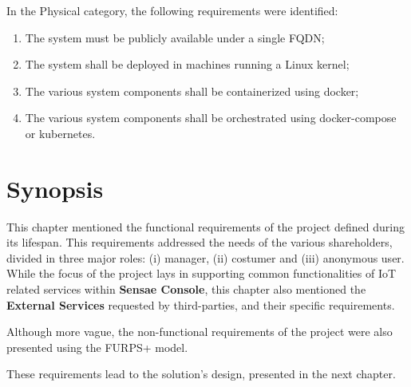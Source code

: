 In the Physical category, the following requirements were identified:

\begin{enumerate}
    \item The system must be publicly available under a single \gls{FQDN};
    \item The system shall be deployed in machines running a Linux kernel;
    \item The various system components shall be containerized using docker;
    \item The various system components shall be orchestrated using docker-compose or kubernetes.
\end{enumerate}

\section{Synopsis}
\label{subsec:requirements:synopsis}

This chapter mentioned the functional requirements of the project defined during its lifespan. This requirements addressed the needs of the various shareholders, divided in three major roles: (i) manager, (ii) costumer and (iii) anonymous user. While the focus of the project lays in supporting common functionalities of \gls{IoT} related services within \textbf{Sensae Console}, this chapter also mentioned the \textbf{External Services} requested by third-parties, and their specific requirements.

Although more vague, the non-functional requirements of the project were also presented using the FURPS+ model.

These requirements lead to the solution's design, presented in the next chapter.
